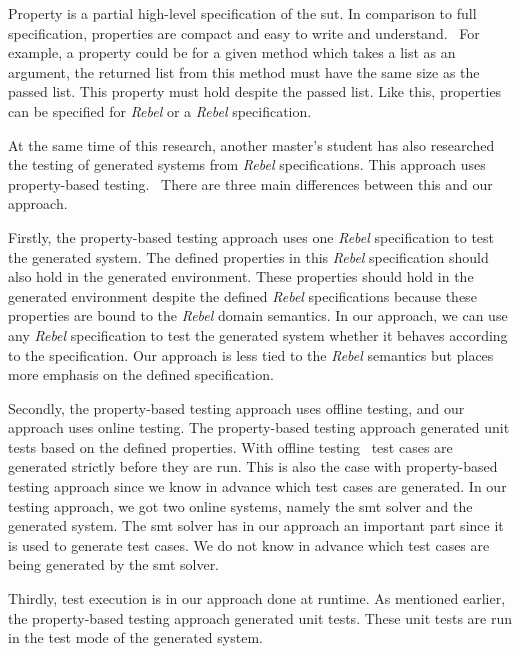 Property is a partial high-level specification of the \gls{sut}. In comparison
to full specification, properties are compact and easy to write and
understand.~\cite[p.~3]{papadakis2011proper} For example, a property could be
for a given method which takes a list as an argument, the returned list from
this method must have the same size as the passed list. This property must hold
despite the passed list. Like this, properties can be specified for
\textit{Rebel} or a \textit{Rebel} specification.

At the same time of this research, another master's student has also researched
the testing of generated systems from \textit{Rebel} specifications.
This approach uses property-based testing.~\cite{kok2017property}
There are three main differences between this and our approach.

Firstly, the property-based testing approach uses one \textit{Rebel}
specification to test the generated system. The defined properties in this
\textit{Rebel} specification should also hold in the generated environment.
These properties should hold in the generated environment despite the defined
\textit{Rebel} specifications because these properties are bound to the
\textit{Rebel} domain semantics. In our approach, we can use any \textit{Rebel}
specification to test the generated system whether it behaves according to the
specification. Our approach is less tied to the \textit{Rebel} semantics but
places more emphasis on the defined specification.

Secondly, the property-based testing approach uses offline testing, and our
approach uses online testing. The property-based testing approach generated unit
tests based on the defined properties.
With offline testing~\cite{utting2012taxonomy} test cases are generated strictly
before they are run. This is also the case with property-based testing approach
since we know in advance which test cases are generated.
In our testing approach, we got two online systems, namely the \gls{smt} solver
and the generated system. The \gls{smt} solver has in our approach an important
part since it is used to generate test cases. We do not know in advance which
test cases are being generated by the \gls{smt} solver.

Thirdly, test execution is in our approach done at runtime.
As mentioned earlier, the property-based testing approach generated unit tests.
These unit tests are run in the test mode of the generated system.

